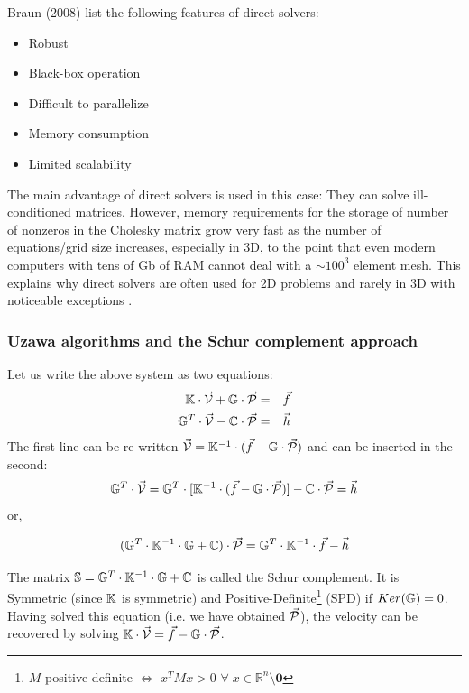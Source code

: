 Braun \etal (2008) \cite{brtf08} list the following features of direct solvers:
\begin{itemize}
\item Robust
\item Black-box operation
\item Difficult to parallelize
\item Memory consumption
\item Limited scalability
\end{itemize}

The main advantage of direct solvers is used in this case: They can solve ill-conditioned 
matrices. However, memory requirements for the storage of number of nonzeros in the 
Cholesky matrix grow very fast as the number of equations/grid size increases, especially in 3D,
to the point that even modern computers with tens of Gb of RAM cannot deal with a $\sim 100^3$ element mesh.
This explains why direct solvers are often used for 2D problems and rarely in 3D with noticeable 
exceptions \cite{thfb08,yahb09,brya10,lobh10,alht11,alht12,alhf13,whbb14,neew18}. 

\subsubsection{Uzawa algorithms and the Schur complement approach }


Let us write the above system as two equations:
\begin{eqnarray}
{\mathbb{K}} \cdot \vec{\cal V} + {\mathbb{G}} \cdot \vec{\cal P} &=& \vec{f} \\
{\mathbb{G}}^T \cdot  \vec{\cal V} - {\mathbb{C}} \cdot \vec{\cal P} &=& \vec{h} 
\end{eqnarray}
The first line can be re-written 
$\vec{\cal V}={\mathbb{K}}^{-1}\cdot (\vec{f} - {\mathbb{G}} \cdot \vec{\cal P})$ and can be inserted in the second:
\begin{equation}
{\mathbb{G}}^T\cdot \vec{\cal V} ={\mathbb{G}}^T \cdot  [ {\mathbb{K}}^{-1} \cdot  (\vec{f} - {\mathbb{G}} \cdot  \vec{\cal P}) ] - {\mathbb{C}}\cdot \vec{\cal P} = \vec{h} 
\end{equation}
or, 
\begin{mdframed}[backgroundcolor=blue!5]
\begin{equation}
({\mathbb{G}}^T \cdot {\mathbb{K}}^{-1} \cdot {\mathbb{G}} + {\mathbb{C}}) \cdot \vec{\cal P} = {\mathbb{G}}^T \cdot {\mathbb{K}}^{-1}\cdot \vec{f} - \vec{h} 
\end{equation}
\end{mdframed}
The matrix ${\mathbb{S}}= {\mathbb{G}}^T \cdot {\mathbb{K}}^{-1} \cdot {\mathbb{G}} + {\mathbb{C}}$ is called the Schur complement. 
It is Symmetric (since ${\mathbb{K}}$ is symmetric) and  Positive-Definite\footnote{$M$ 
positive definite $\iff$ $x^TMx>0$ $\forall \; x\in \mathbb{R}^n \setminus {\bm 0}$ }
(SPD)  if $Ker({{\mathbb{G}}})=0$. 
Having solved this equation (i.e. we have obtained $\vec{\cal P}$), the velocity can be recovered by solving 
${\mathbb{K}}\cdot \vec{\cal V} =\vec{f}- {\mathbb{G}} \cdot \vec{\cal P}$. 

